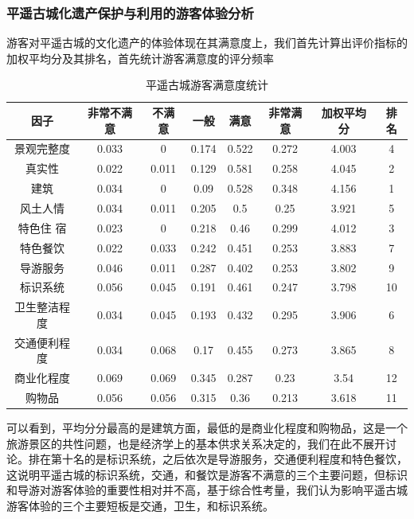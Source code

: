 \documentclass[UTF8]{ctexart}
\begin{document}
        \subsubsection{平遥古城化遗产保护与利用的游客体验分析}
        游客对平遥古城的文化遗产的体验体现在其满意度上，我们首先计算出评价指标的加权平均分及其排名，首先统计游客满意度的评分频率
            \begin{table}[H]
                \centering
                \caption{平遥古城游客满意度统计}
                \begin{tabular}{cccccccc}
                    \toprule
                    因子&非常不满意&不满意&一般&满意&非常满意&加权平均分&排名\\
                    \midrule
                    景观完整度&0.033&0	&0.174&0.522	&0.272&4.003  &4\\
                    真实性&0.022	&0.011	&0.129&	0.581	&0.258&4.045&2\\
                    建筑&0.034	&0	&0.09	&0.528& 0.348&4.156&1\\
                    风土人情&0.034	&0.011	&0.205	&0.5	&0.25&3.921&5\\
                    特色住 宿&0.023	&0&	0.218&	0.46&	0.299&4.012&3\\
                    特色餐饮&0.022	&0.033&	0.242	&0.451	&0.253&3.883&7\\
                    导游服务&0.046	&0.011	&0.287&0.402	&0.253&3.802&9\\
                    标识系统&0.056	&0.045	&0.191	&0.461	&0.247&3.798&10\\
                    卫生整洁程度&0.034	&0.045	&0.193	&0.432	&0.295&3.906&6\\
                    交通便利程度&0.034	&0.068	&0.17	&0.455&	0.273&3.865&8\\
                    商业化程度&0.069&0.069&0.345&0.287&0.23&3.54&12\\
                    购物品&0.056&	0.056	&0.315	&0.36	&0.213&3.618&11\\
                    \bottomrule
                \end{tabular}
            \end{table}
        可以看到，平均分分最高的是建筑方面，最低的是商业化程度和购物品，这是一个旅游景区的共性问题，也是经济学上的基本供求关系决定的，我们在此不展开讨论。排在第十名的是标识系统，之后依次是导游服务，交通便利程度和特色餐饮，这说明平遥古城的标识系统，交通，和餐饮是游客不满意的三个主要问题，但标识和导游对游客体验的重要性相对并不高，基于综合性考量，我们认为影响平遥古城游客体验的三个主要短板是交通，卫生，和标识系统。
\end{document}
